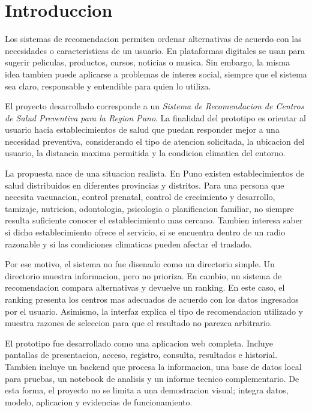 \documentclass[12pt,a4paper]{article}
\begin{document}
\hypersetup{pageanchor=true}
\tableofcontents
\newpage
{}

\section{Introduccion}
Los sistemas de recomendacion permiten ordenar alternativas de acuerdo con las necesidades o caracteristicas de un usuario. En plataformas digitales se usan para sugerir peliculas, productos, cursos, noticias o musica. Sin embargo, la misma idea tambien puede aplicarse a problemas de interes social, siempre que el sistema sea claro, responsable y entendible para quien lo utiliza.

El proyecto desarrollado corresponde a un \textit{Sistema de Recomendacion de Centros de Salud Preventiva para la Region Puno}. La finalidad del prototipo es orientar al usuario hacia establecimientos de salud que puedan responder mejor a una necesidad preventiva, considerando el tipo de atencion solicitada, la ubicacion del usuario, la distancia maxima permitida y la condicion climatica del entorno.

La propuesta nace de una situacion realista. En Puno existen establecimientos de salud distribuidos en diferentes provincias y distritos. Para una persona que necesita vacunacion, control prenatal, control de crecimiento y desarrollo, tamizaje, nutricion, odontologia, psicologia o planificacion familiar, no siempre resulta suficiente conocer el establecimiento mas cercano. Tambien interesa saber si dicho establecimiento ofrece el servicio, si se encuentra dentro de un radio razonable y si las condiciones climaticas pueden afectar el traslado.

Por ese motivo, el sistema no fue disenado como un directorio simple. Un directorio muestra informacion, pero no prioriza. En cambio, un sistema de recomendacion compara alternativas y devuelve un ranking. En este caso, el ranking presenta los centros mas adecuados de acuerdo con los datos ingresados por el usuario. Asimismo, la interfaz explica el tipo de recomendacion utilizado y muestra razones de seleccion para que el resultado no parezca arbitrario.

El prototipo fue desarrollado como una aplicacion web completa. Incluye pantallas de presentacion, acceso, registro, consulta, resultados e historial. Tambien incluye un backend que procesa la informacion, una base de datos local para pruebas, un notebook de analisis y un informe tecnico complementario. De esta forma, el proyecto no se limita a una demostracion visual; integra datos, modelo, aplicacion y evidencias de funcionamiento.
\end{document}
